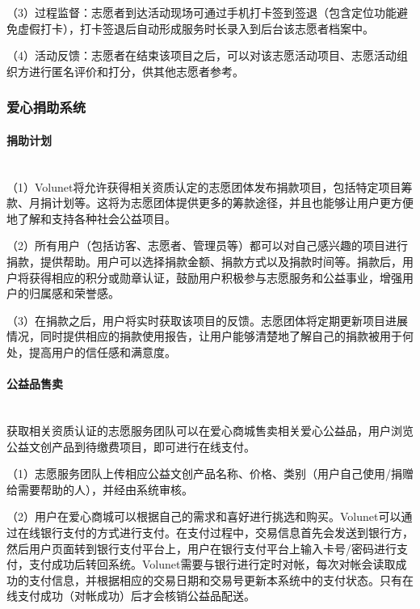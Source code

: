 （3）过程监督：志愿者到达活动现场可通过手机打卡签到签退（包含定位功能避免虚假打卡），打卡签退后自动形成服务时长录入到后台该志愿者档案中。

（4）活动反馈：志愿者在结束该项目之后，可以对该志愿活动项目、志愿活动组织方进行匿名评价和打分，供其他志愿者参考。




\subsubsection{爱心捐助系统}

\paragraph{捐助计划}~{}
\\

（1）Volunet将允许获得相关资质认定的志愿团体发布捐款项目，包括特定项目筹款、月捐计划等。这将为志愿团体提供更多的筹款途径，并且也能够让用户更方便地了解和支持各种社会公益项目。

（2）所有用户（包括访客、志愿者、管理员等）都可以对自己感兴趣的项目进行捐款，提供帮助。用户可以选择捐款金额、捐款方式以及捐款时间等。捐款后，用户将获得相应的积分或勋章认证，鼓励用户积极参与志愿服务和公益事业，增强用户的归属感和荣誉感。

（3）在捐款之后，用户将实时获取该项目的反馈。志愿团体将定期更新项目进展情况，同时提供相应的捐款使用报告，让用户能够清楚地了解自己的捐款被用于何处，提高用户的信任感和满意度。

\paragraph{公益品售卖}~{}
\\

获取相关资质认证的志愿服务团队可以在爱心商城售卖相关爱心公益品，用户浏览公益文创产品到待缴费项目，即可进行在线支付。

（1）志愿服务团队上传相应公益文创产品名称、价格、类别（用户自己使用/捐赠给需要帮助的人），并经由系统审核。

（2）用户在爱心商城可以根据自己的需求和喜好进行挑选和购买。Volunet可以通过在线银行支付的方式进行支付。在支付过程中，交易信息首先会发送到银行方，然后用户页面转到银行支付平台上，用户在银行支付平台上输入卡号/密码进行支付，支付成功后转回系统。Volunet需要与银行进行定时对帐，每次对帐会读取成功的支付信息，并根据相应的交易日期和交易号更新本系统中的支付状态。只有在线支付成功（对帐成功）后才会核销公益品配送。

